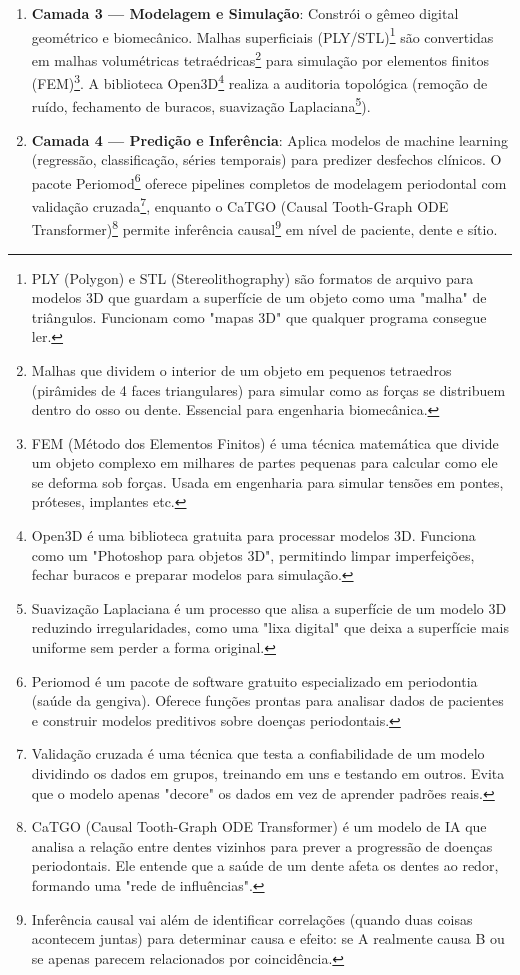 \begin{enumerate}
    \item \textbf{Camada 3 --- Modelagem e Simulação}: Constrói o gêmeo digital geométrico e biomecânico. Malhas superficiais (PLY/STL)\footnote{PLY (Polygon) e STL (Stereolithography) são formatos de arquivo para modelos 3D que guardam a superfície de um objeto como uma "malha" de triângulos. Funcionam como "mapas 3D" que qualquer programa consegue ler.} são convertidas em malhas volumétricas tetraédricas\footnote{Malhas que dividem o interior de um objeto em pequenos tetraedros (pirâmides de 4 faces triangulares) para simular como as forças se distribuem dentro do osso ou dente. Essencial para engenharia biomecânica.} para simulação por elementos finitos (FEM)\footnote{FEM (Método dos Elementos Finitos) é uma técnica matemática que divide um objeto complexo em milhares de partes pequenas para calcular como ele se deforma sob forças. Usada em engenharia para simular tensões em pontes, próteses, implantes etc.}. A biblioteca Open3D\footnote{Open3D é uma biblioteca gratuita para processar modelos 3D. Funciona como um "Photoshop para objetos 3D", permitindo limpar imperfeições, fechar buracos e preparar modelos para simulação.} realiza a auditoria topológica (remoção de ruído, fechamento de buracos, suavização Laplaciana\footnote{Suavização Laplaciana é um processo que alisa a superfície de um modelo 3D reduzindo irregularidades, como uma "lixa digital" que deixa a superfície mais uniforme sem perder a forma original.}).
    
    \item \textbf{Camada 4 --- Predição e Inferência}: Aplica modelos de machine learning (regressão, classificação, séries temporais) para predizer desfechos clínicos. O pacote Periomod\footnote{Periomod é um pacote de software gratuito especializado em periodontia (saúde da gengiva). Oferece funções prontas para analisar dados de pacientes e construir modelos preditivos sobre doenças periodontais.} oferece pipelines completos de modelagem periodontal com validação cruzada\footnote{Validação cruzada é uma técnica que testa a confiabilidade de um modelo dividindo os dados em grupos, treinando em uns e testando em outros. Evita que o modelo apenas "decore" os dados em vez de aprender padrões reais.}, enquanto o CaTGO (Causal Tooth-Graph ODE Transformer)\footnote{CaTGO (Causal Tooth-Graph ODE Transformer) é um modelo de IA que analisa a relação entre dentes vizinhos para prever a progressão de doenças periodontais. Ele entende que a saúde de um dente afeta os dentes ao redor, formando uma "rede de influências".} permite inferência causal\footnote{Inferência causal vai além de identificar correlações (quando duas coisas acontecem juntas) para determinar causa e efeito: se A realmente causa B ou se apenas parecem relacionados por coincidência.} em nível de paciente, dente e sítio.
    

\end{enumerate}
